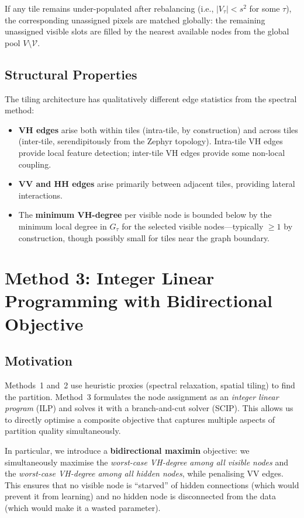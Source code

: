 \documentclass[11pt,a4paper]{article}
\newcommand{\VV}{\mathcal{V}}
\begin{document}
If any tile remains under-populated after rebalancing (i.e., $|V_\tau|<s^2$ for some $\tau$), the corresponding unassigned pixels are matched globally: the remaining unassigned visible slots are filled by the nearest available nodes from the global pool $V\setminus\VV$.

\subsection{Structural Properties}

The tiling architecture has qualitatively different edge statistics from the spectral method:
\begin{itemize}[nosep]
  \item \textbf{VH edges} arise both within tiles (intra-tile, by construction) and across tiles (inter-tile, serendipitously from the Zephyr topology).  Intra-tile VH edges provide local feature detection; inter-tile VH edges provide some non-local coupling.
  \item \textbf{VV and HH edges} arise primarily between adjacent tiles, providing lateral interactions.
  \item The \textbf{minimum VH-degree} per visible node is bounded below by the minimum local degree in $G_\tau$ for the selected visible nodes---typically $\geq 1$ by construction, though possibly small for tiles near the graph boundary.
\end{itemize}


\section{Method 3: Integer Linear Programming with Bidirectional Objective}\label{sec:ilp}

\subsection{Motivation}

Methods~1 and~2 use heuristic proxies (spectral relaxation, spatial tiling) to find the partition.  Method~3 formulates the node assignment as an \emph{integer linear program} (ILP) and solves it with a branch-and-cut solver (SCIP).  This allows us to directly optimise a composite objective that captures multiple aspects of partition quality simultaneously.

In particular, we introduce a \textbf{bidirectional maximin} objective: we simultaneously maximise the \emph{worst-case VH-degree among all visible nodes} and the \emph{worst-case VH-degree among all hidden nodes}, while penalising VV edges.  This ensures that no visible node is ``starved'' of hidden connections (which would prevent it from learning) and no hidden node is disconnected from the data (which would make it a wasted parameter).
\end{document}
